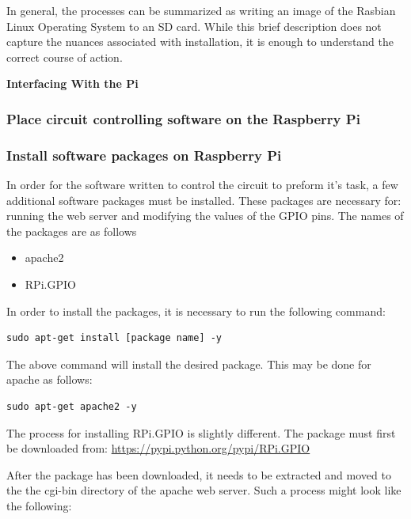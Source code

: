 \documentclass{article}	%
\begin{document}
\begin{multicols}{2}
In general,
the processes can be summarized as 
writing an image of the Rasbian Linux Operating System to
an SD card.
While this brief description does not capture the nuances
associated with installation,
it is enough to understand the correct
course of action.

\textbf{Interfacing With the Pi}

\subsubsection{Place circuit controlling software on the Raspberry Pi}

\subsubsection{Install software packages on Raspberry Pi}
In order for the software written to
control the circuit to preform it's task,
a few additional software packages must be installed.
These packages are necessary for:
running the web server
and modifying the values of the GPIO pins.
The names of the packages are as follows

\begin{itemize}
\item apache2
\item RPi.GPIO
\end{itemize}

In order to install the packages,
it is necessary to run the following command:

\begin{lstlisting}
sudo apt-get install [package name] -y
\end{lstlisting}

The above command will install the desired package.
This may be done for apache as follows:

\begin{lstlisting}
sudo apt-get apache2 -y
\end{lstlisting}

The process for installing RPi.GPIO is slightly different.
The package must first be downloaded from:
\url{https://pypi.python.org/pypi/RPi.GPIO}

After the package has been downloaded,
it needs to be extracted and moved to the
the cgi-bin directory of the apache web server.
Such a process might look like the following:


\end{multicols}
\end{document}
